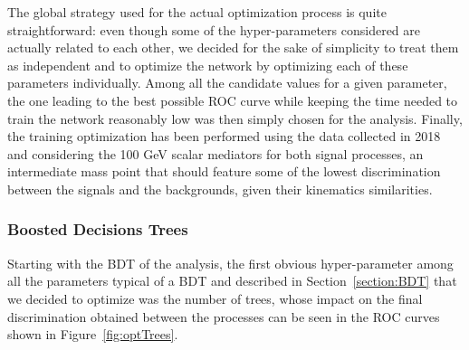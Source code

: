\documentclass[a4paper, 10pt, openright]{report}
\begin{document}
\begin{appendices}
The global strategy used for the actual optimization process is quite straightforward: even though some of the hyper-parameters considered are actually related to each other, we decided for the sake of simplicity to treat them as independent and to optimize the network by optimizing each of these parameters individually. Among all the candidate values for a given parameter, the one leading to the best possible ROC curve while keeping the time needed to train the network reasonably low was then simply chosen for the analysis. Finally, the training optimization has been performed using the data collected in 2018 and considering the 100 GeV scalar mediators for both signal processes, an intermediate mass point that should feature some of the lowest discrimination between the signals and the backgrounds, given their kinematics similarities. %

\subsubsection{Boosted Decisions Trees}

Starting with the \ac{BDT} of the analysis, the first obvious hyper-parameter among all the parameters typical of a \ac{BDT} and described in Section~\ref{section:BDT} that we decided to optimize was the number of trees, whose impact on the final discrimination obtained between the processes can be seen in the \ac{ROC} curves shown in Figure~\ref{fig:optTrees}.



\end{appendices}
\end{document}
